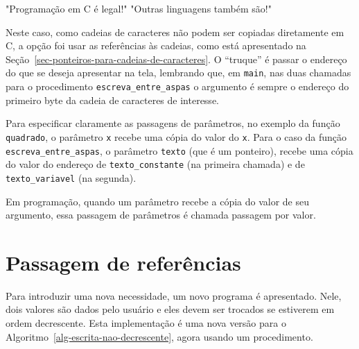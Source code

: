 \documentclass[
  11pt,
  a4paper,
]{scrbook}
\newenvironment{Shaded}{\begin{snugshade}}{\end{snugshade}}
\newcommand{\NormalTok}[1]{#1}
\begin{document}
\begin{Shaded}
\begin{Highlighting}[]
\NormalTok{"Programação em C é legal!"}
\NormalTok{"Outras linguagens também são!"}
\end{Highlighting}
\end{Shaded}

Neste caso, como cadeias de caracteres não podem ser copiadas
diretamente em C, a opção foi usar as referências às cadeias, como está
apresentado na Seção~\ref{sec-ponteiros-para-cadeias-de-caracteres}. O
``truque'' é passar o endereço do que se deseja apresentar na tela,
lembrando que, em \texttt{main}, nas duas chamadas para o procedimento
\texttt{escreva\_entre\_aspas} o argumento é sempre o endereço do
primeiro byte da cadeia de caracteres de interesse.

Para especificar claramente as passagens de parâmetros, no exemplo da
função \texttt{quadrado}, o parâmetro \texttt{x} recebe uma cópia do
valor do \texttt{x}. Para o caso da função
\texttt{escreva\_entre\_aspas}, o parâmetro \texttt{texto} (que é um
ponteiro), recebe uma cópia do valor do endereço de
\texttt{texto\_constante} (na primeira chamada) e de
\texttt{texto\_variavel} (na segunda).

Em programação, quando um parâmetro recebe a cópia do valor de seu
argumento, essa passagem de parâmetros é chamada passagem por valor.

\section{Passagem de referências}\label{sec-passagem-por-referencia}

Para introduzir uma nova necessidade, um novo programa é apresentado.
Nele, dois valores são dados pelo usuário e eles devem ser trocados se
estiverem em ordem decrescente. Esta implementação é uma nova versão
para o Algoritmo~\ref{alg-escrita-nao-decrescente}, agora usando um
procedimento.
\end{document}
